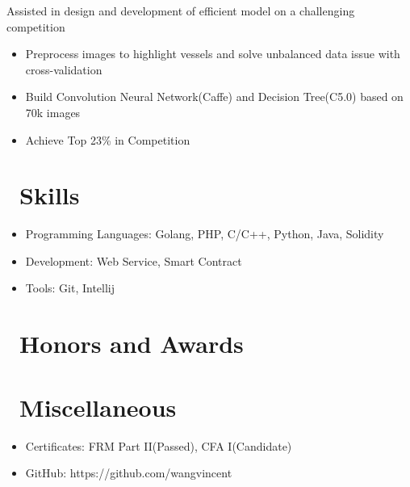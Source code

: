 \documentclass{resume}
\begin{document}
Assisted in design and development of efficient model on a challenging competition
\begin{itemize}
  \item Preprocess images to highlight vessels and solve unbalanced data issue with cross-validation
  \item Build Convolution Neural Network(Caffe) and Decision Tree(C5.0) based on 70k images
  \item Achieve Top 23\% in Competition
\end{itemize}


\section{\faCogs\ Skills}
\begin{itemize}[parsep=0.5ex]
  \item Programming Languages: Golang, PHP, C/C++, Python, Java, Solidity
  \item Development: Web Service, Smart Contract
  \item Tools: Git, Intellij
\end{itemize}

\section{\faHeartO\ Honors and Awards}

\section{\faInfo\ Miscellaneous}
\begin{itemize}[parsep=0.5ex]
  \item Certificates: FRM Part II(Passed), CFA I(Candidate)
  \item GitHub: https://github.com/wangvincent
\end{itemize}

%
%
\end{document}
